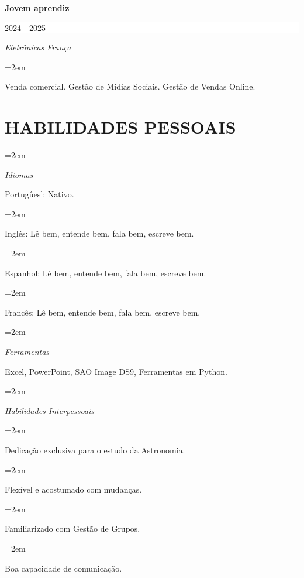 \documentclass[paper=a4,fontsize=11pt]{scrartcl} %
\newlength{\spacebox}
\newcommand{\sepspace}{\vspace*{1em}}		%
\newcommand{\NewPart}[1]{\section*{\uppercase{#1}}}
\newcommand{\PersonalEntry}[2]{
		\noindent\hangindent=2em\hangafter=0 %
		\parbox{\spacebox}{        %
		\textit{#1}}		       %
		\hspace{1.5em} #2 \par}    %
\newcommand{\SkillsEntry}[2]{      %
		\noindent\hangindent=2em\hangafter=0 %
		\parbox{\spacebox}{        %
		\textit{#1}}			   %
		\hspace{1.5em} #2 \par}    %
\newcommand{\EducationEntry}[4]{
		\noindent \textbf{#1} \hfill      %
		\colorbox{White}{%
			\parbox{5cm}{%
			\hfill\color{Black}#2}} \par  %
		\noindent \textit{#3} \par        %
		\noindent\hangindent=2em\hangafter=0 \small #4 %
		\normalsize \par}
\begin{document}
\sepspace

\EducationEntry{Jovem aprendiz}{2024 - 2025 }{Eletrônicas França}{
 
 \sepspace
 
{Venda comercial.}
{Gestão de Mídias Sociais.}
{Gestão de Vendas Online.}
}

\NewPart{Habilidades Pessoais}{}

\SkillsEntry{Idiomas}{Portugûesl: Nativo.}
\SkillsEntry{}{Inglés: Lê bem, entende bem, fala bem, escreve bem.}
\SkillsEntry{}{Espanhol: Lê bem, entende bem, fala bem, escreve bem.}
\SkillsEntry{}{Francês: Lê bem, entende bem, fala bem, escreve bem.}
\vspace{0.7cm}
\SkillsEntry{Ferramentas}{Excel, PowerPoint, SAO Image DS9, Ferramentas em Python.}
\vspace{0,7cm}
\SkillsEntry{Habilidades Interpessoais}{}
\SkillsEntry{}{Dedicação exclusiva para o estudo da Astronomia.}
\SkillsEntry{}{Flexível e acostumado com mudanças.}
\SkillsEntry{}{Familiarizado com Gestão de Grupos.}
\SkillsEntry{}{Boa capacidade de comunicação.}




\end{document}
